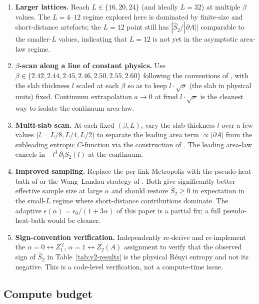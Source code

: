 \documentclass[11pt,a4paper]{article}
\theoremstyle{definition}
\begin{document}
\begin{enumerate}
\item \textbf{Larger lattices.} Reach $L \in \{16, 20, 24\}$ (and
      ideally $L = 32$) at multiple $\beta$ values. The
      $L = 4$--$12$ regime explored here is dominated by finite-size
      and short-distance artefacts; the $L = 12$ point still has
      $|\widehat S_2/|\partial A||$ comparable to the smaller-$L$
      values, indicating that $L = 12$ is not yet in the asymptotic
      area-law regime.
\item \textbf{$\beta$-scan along a line of constant physics.} Use
      $\beta \in \{2.42, 2.44, 2.45, 2.46, 2.50, 2.55, 2.60\}$
      following the conventions of \cite[Table~II]{Rabenstein2019},
      with the slab thickness $l$ scaled at each $\beta$ so as to
      keep $l\cdot \sqrt{\sigma}$ (the slab in physical units) fixed.
      Continuum extrapolation $a \to 0$ at fixed $l\cdot \sqrt\sigma$
      is the cleanest way to isolate the continuum area-law.
\item \textbf{Multi-slab scan.} At each fixed $(\beta, L)$, vary the
      slab thickness $l$ over a few values ($l = L/8, L/4, L/2$) to
      separate the leading area term $\propto |\partial A|$ from the
      subleading entropic $C$-function via the construction of
      \cite[Eq.~(20)]{Rabenstein2019}. The leading area-law cancels
      in $-l^{3}\,\partial_{l} S_2(l)$ at the continuum.
\item \textbf{Improved sampling.} Replace the per-link Metropolis
      with the pseudo-heat-bath of \cite[\S IV]{Rabenstein2019} or
      the Wang--Landau strategy of \cite{Rindlisbacher2022}. Both
      give significantly better effective sample size at large
      $\alpha$ and should restore $\widehat S_2 \ge 0$ in
      expectation in the small-$L$ regime where short-distance
      contributions dominate. The adaptive
      $\epsilon(\alpha) = \epsilon_0/(1+3\alpha)$ of this paper is a
      partial fix; a full pseudo-heat-bath would be cleaner.
\item \textbf{Sign-convention verification.} Independently re-derive
      and re-implement the $\alpha = 0 \leftrightarrow Z_1^{\,2}$,
      $\alpha = 1 \leftrightarrow Z_2(A)$ assignment to verify that
      the observed sign of $\widehat S_2$ in
      Table~\ref{tab:v2-results} is the physical Rényi entropy and
      not its negative. This is a code-level verification, not a
      compute-time issue.
\end{enumerate}

\subsection{Compute budget}
\end{document}
